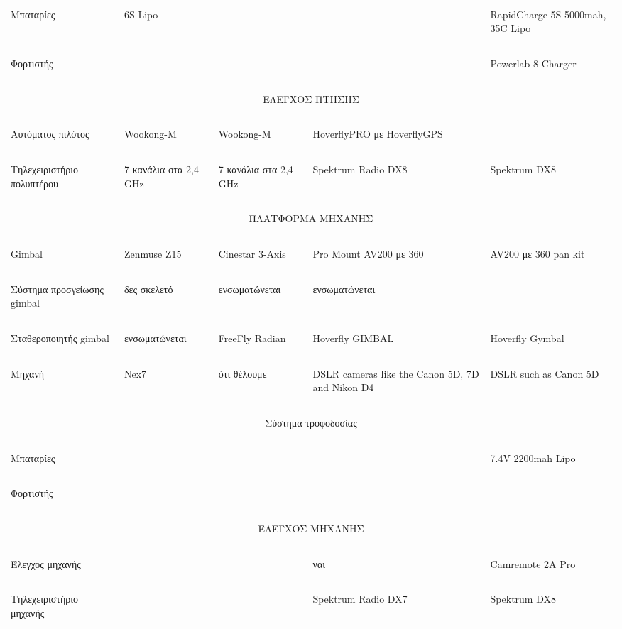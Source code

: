 \documentclass[a4paper, 12pt, twoside]{report}
\begin{document}
\begin{landscape}
\begin{longtable}{ m{3cm} m{2.2cm} m{2.2cm} m{2.2cm} m{2.2cm} }
				Μπαταρίες & 6S Lipo & & & RapidCharge 5S 5000mah, 35C Lipo\\
				\hdashline
				~\\
				Φορτιστής & & & & Powerlab 8 Charger\\
				\hdashline
				~\\
				\multicolumn{5}{c}{ΕΛΕΓΧΟΣ ΠΤΗΣΗΣ}\\
				\hline
				~\\
				Αυτόματος πιλότος & Wookong-M & Wookong-M & HoverflyPRO με HoverflyGPS & \\
				\hdashline
				~\\
				Τηλεχειριστήριο πολυπτέρου & 7 κανάλια στα 2,4 GHz & 7 κανάλια στα 2,4 GHz & Spektrum Radio DX8 & Spektrum DX8\\
				\hdashline
				~\\
				\multicolumn{5}{c}{ΠΛΑΤΦΟΡΜΑ ΜΗΧΑΝΗΣ}\\
				\hline
				~\\
				Gimbal & Zenmuse Z15 & Cinestar 3-Axis & Pro Mount AV200 με 360 & AV200 με 360 pan kit\\
				\hdashline
				~\\
				Σύστημα προσγείωσης gimbal & δες σκελετό & ενσωματώνεται & ενσωματώνεται & \\
				\hdashline
				~\\
				Σταθεροποιητής gimbal & ενσωματώνεται & FreeFly Radian & Hoverfly GIMBAL & Hoverfly Gymbal\\
				\hdashline
				~\\
				Μηχανή & Nex7 & ότι θέλουμε & DSLR cameras like the Canon 5D, 7D and Nikon D4 & DSLR such as Canon 5D\\
				\hdashline
				~\\
				\multicolumn{5}{c}{Σύστημα τροφοδοσίας}\\
				\hdashline
				~\\
				Μπαταρίες & & & & 7.4V 2200mah Lipo\\
				\hdashline
				~\\
				Φορτιστής & & & & \\
				\hdashline
				~\\
				\multicolumn{5}{c}{ΕΛΕΓΧΟΣ ΜΗΧΑΝΗΣ}\\
				\hline
				~\\
				Έλεγχος μηχανής & & & ναι & Camremote 2A Pro\\
				\hdashline
				~\\
				Τηλεχειριστήριο μηχανής & & & Spektrum Radio DX7 & Spektrum DX8\\

\end{longtable}
\end{landscape}
\end{document}
